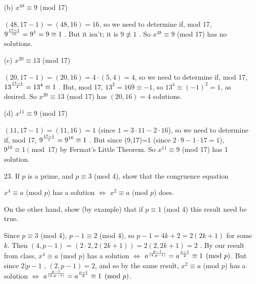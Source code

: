 \msk

\hskip1in (b) $x^{48}\equiv 9$ (mod 17)

\msk

\item{} $(48,17-1)=(48,16)=16$, so we need to determine if, mod 17, 
$\displaystyle 9^{{17-1}\over{16}} = 9^1 = 9\equiv 1$ . But it isn't; it is $9\not\equiv 1$ . So
$x^{48}\equiv 9$ (mod 17) has no solutions.

\msk

\hskip1in (c) $x^{20}\equiv 13$ (mod 17)

\msk

\item{} $(20,17-1)=(20,16)=4\cdot (5,4) =4$, so we need to determine if, mod 17, 
$\displaystyle 13^{{17-1}\over{4}} = 13^4\equiv 1$ . But, mod 17, $13^2=169\equiv -1$,
so $13^4\equiv (-1)^2=1$, as desired. So $x^{20}\equiv 13$ (mod 17) has $(20,16)=4$ solutions.

\msk

\hskip1in (d) $x^{11}\equiv 9$ (mod 17)

\msk


\item{} $(11,17-1)=(11,16)=1$ (since $1=3\cdot 11-2\cdot 16$), so we need to determine if, mod 17, 
$\displaystyle 9^{{17-1}\over{1}} = 9^{16}\equiv 1$ . But since (9,17)=1 (since $2\cdot 9-1\cdot 17=1$),
$9^{16}\equiv 1\pmod{17}$ by Fermat's Little Theorem. So $x^{11}\equiv 9$ (mod 17) has 1 solution.

\bsk

\item{23.}  If $p$ is a prime, and $p\equiv 3$ (mod 4), show that the congruence equation

\ssk

\item{} $x^4\equiv a$ (mod $p$) has a solution $\Leftrightarrow$ $x^2\equiv a$ (mod $p$) does.

\ssk

\item{} On the other hand, show (by example) that if $p\equiv 1$ (mod 4) this result need 
be true.

\msk

\item{} Since $p\equiv 3$ (mod 4), $p-1\equiv 2$ (mod 4), so $p-1=4k+2 = 2(2k+1)$ for some $k$.
Then $(4,p-1)$ = $(2\cdot 2,2(2k+1)) = 2(2,2k+1) = 2$ . By our result from class, $x^4\equiv a$ (mod $p$)
has a solution $\Leftrightarrow$ $\displaystyle a^{{p-1}\over{(4,p-1)}} = a^{{p-1}\over{2}} \equiv 1\pmod{p}$.
But since $2|p-1$ , $(2,p-1)=2$, and so by the same result, $x^2\equiv a$ (mod $p$)
has a solution $\Leftrightarrow$ $\displaystyle a^{{p-1}\over{(2,p-1)}} = a^{{p-1}\over{2}} \equiv 1\pmod{p}$.

